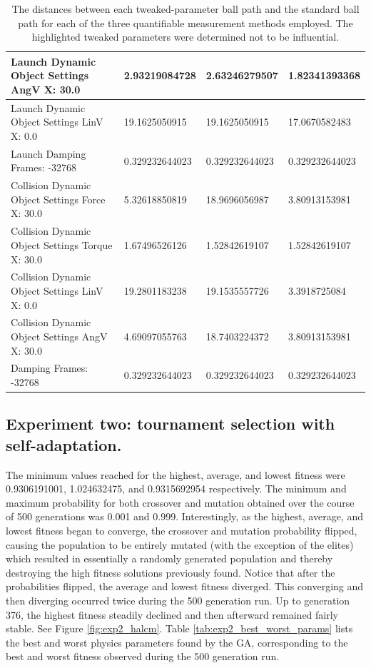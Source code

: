 \begin{table}[htbp]
\begin{tabular}{ | l || l | l | l | }
Launch Dynamic Object Settings AngV X: 30.0 & 2.93219084728  & 2.63246279507  & 1.82341393368 \\ \hline
Launch Dynamic Object Settings LinV X: 0.0 & 19.1625050915  & 19.1625050915  & 17.0670582483 \\ \hline
\rowcolor{cyan}
Launch Damping Frames: -32768 & 0.329232644023 & 0.329232644023  & 0.329232644023 \\ \hline
Collision Dynamic Object Settings Force X: 30.0 & 5.32618850819  & 18.9696056987  & 3.80913153981 \\ \hline
Collision Dynamic Object Settings Torque X: 30.0 & 1.67496526126  & 1.52842619107  & 1.52842619107 \\ \hline
Collision Dynamic Object Settings LinV X: 0.0 & 19.2801183238  & 19.1535557726  & 3.3918725084 \\ \hline
Collision Dynamic Object Settings AngV X: 30.0 & 4.69097055763 & 18.7403224372 & 3.80913153981 \\ \hline
\rowcolor{cyan}
Damping Frames: -32768 & 0.329232644023 & 0.329232644023 & 0.329232644023 \\ \hline
\end{tabular}
\caption[Physics Engine Parameter Influences]{The distances between each tweaked-parameter ball path and the standard ball path for each of the three quantifiable measurement methods employed. The highlighted tweaked parameters were determined not to be influential.}
\label{tab:distances}
\end{table}

\newpage

\subsection[Experiment Two]{Experiment two: tournament selection with self-adaptation.}
\label{subsec:bbautotune_exp_two}

The minimum values reached for the highest, average, and lowest fitness were 0.9306191001, 1.024632475, and 0.9315692954 respectively. The minimum and maximum probability for both crossover and mutation obtained over the course of 500 generations was 0.001 and 0.999. Interestingly, as the highest, average, and lowest fitness began to converge, the crossover and mutation probability flipped, causing the population to be entirely mutated (with the exception of the elites) which resulted in essentially a randomly generated population and thereby destroying the high fitness solutions previously found. Notice that after the probabilities flipped, the average and lowest fitness diverged. This converging and then diverging occurred twice during the 500 generation run. Up to generation 376, the highest fitness steadily declined and then afterward remained fairly stable. See Figure \ref{fig:exp2_halcm}. Table \ref{tab:exp2_best_worst_params} lists the best and worst physics parameters found by the GA, corresponding to the best and worst fitness observed during the 500 generation run.

